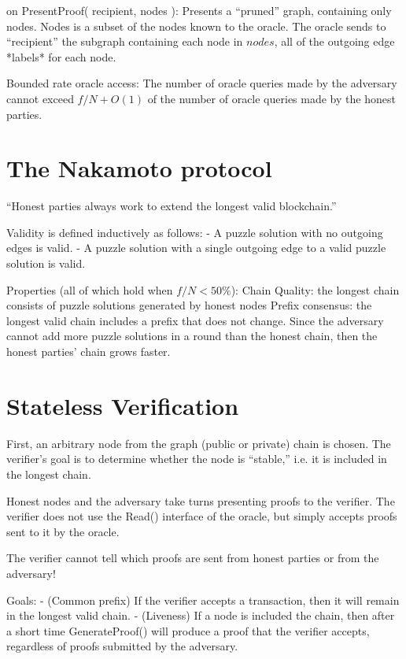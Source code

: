 \documentclass[11pt]{llncs}
\begin{document}
    on PresentProof( recipient, nodes ):
        Presents a “pruned” graph, containing only nodes.
        Nodes is a subset of the nodes known to the oracle.
        The oracle sends to “recipient” the subgraph containing each node in $nodes$, all of the outgoing edge *labels* for each node.

Bounded rate oracle access:
    The number of oracle queries made by the adversary cannot exceed $f/N +
    O(1)$ of the number of oracle queries made by the honest parties.

\section{The Nakamoto protocol}

``Honest parties always work to extend the longest valid blockchain.''

Validity is defined inductively as follows:
- A puzzle solution with no outgoing edges is valid.
- A puzzle solution with a single outgoing edge to a valid puzzle solution is valid.

Properties (all of which hold when $f/N < 50\%$):
    Chain Quality:  the longest chain consists of puzzle solutions generated by honest nodes
    Prefix consensus: the longest valid chain includes a prefix that does not change.
        Since the adversary cannot add more puzzle solutions in a round than the honest chain, then the honest parties’ chain grows faster.

\section{Stateless Verification}

First, an arbitrary node from the graph (public or private) chain is chosen.
The verifier’s goal is to determine whether the node is ``stable,'' i.e. it is included in the longest chain.

Honest nodes and the adversary take turns presenting proofs to the verifier. The verifier does not use the Read() interface of the oracle, but simply accepts proofs sent to it by the oracle.

The verifier cannot tell which proofs are sent from honest parties or from the adversary!

Goals:
- (Common prefix) If the verifier accepts a transaction, then it will remain in the longest valid chain.
- (Liveness) If a node is included the chain, then after a short time GenerateProof() will produce a proof that the verifier accepts, regardless of proofs submitted by the adversary.
\end{document}
